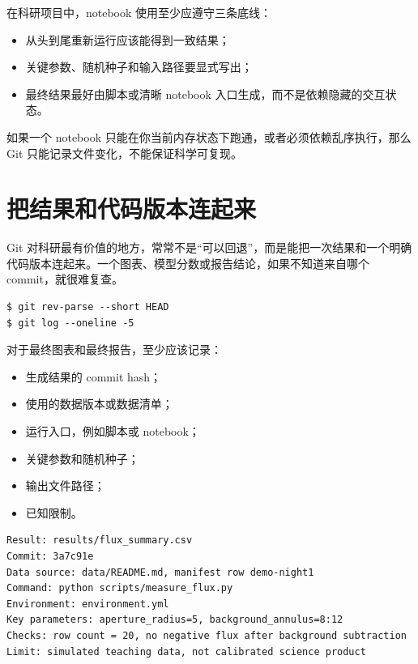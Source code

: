 在科研项目中，notebook 使用至少应遵守三条底线：

\begin{itemize}
    \item 从头到尾重新运行应该能得到一致结果；
    \item 关键参数、随机种子和输入路径要显式写出；
    \item 最终结果最好由脚本或清晰 notebook 入口生成，而不是依赖隐藏的交互状态。
\end{itemize}

如果一个 notebook 只能在你当前内存状态下跑通，或者必须依赖乱序执行，那么 Git 只能记录文件变化，不能保证科学可复现。

\section{把结果和代码版本连起来}

Git 对科研最有价值的地方，常常不是“可以回退”，而是能把一次结果和一个明确代码版本连起来。一个图表、模型分数或报告结论，如果不知道来自哪个 commit，就很难复查。

\begin{examplebox}[记录当前版本]
\begin{lstlisting}[style=terminal]
$ git rev-parse --short HEAD
$ git log --oneline -5
\end{lstlisting}
\end{examplebox}

对于最终图表和最终报告，至少应该记录：

\begin{itemize}
    \item 生成结果的 commit hash；
    \item 使用的数据版本或数据清单；
    \item 运行入口，例如脚本或 notebook；
    \item 关键参数和随机种子；
    \item 输出文件路径；
    \item 已知限制。
\end{itemize}

\begin{examplebox}[最小版本化结果记录]
\begin{lstlisting}[style=terminal]
Result: results/flux_summary.csv
Commit: 3a7c91e
Data source: data/README.md, manifest row demo-night1
Command: python scripts/measure_flux.py
Environment: environment.yml
Key parameters: aperture_radius=5, background_annulus=8:12
Checks: row count = 20, no negative flux after background subtraction
Limit: simulated teaching data, not calibrated science product
\end{lstlisting}
\end{examplebox}

